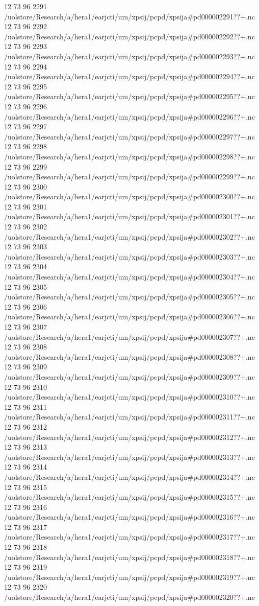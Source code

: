 12 73 96
2291
/uolstore/Research/a/hera1/earjcti/um/xpsij/pcpd/xpsija#pd000002291??+.nc
12 73 96
2292
/uolstore/Research/a/hera1/earjcti/um/xpsij/pcpd/xpsija#pd000002292??+.nc
12 73 96
2293
/uolstore/Research/a/hera1/earjcti/um/xpsij/pcpd/xpsija#pd000002293??+.nc
12 73 96
2294
/uolstore/Research/a/hera1/earjcti/um/xpsij/pcpd/xpsija#pd000002294??+.nc
12 73 96
2295
/uolstore/Research/a/hera1/earjcti/um/xpsij/pcpd/xpsija#pd000002295??+.nc
12 73 96
2296
/uolstore/Research/a/hera1/earjcti/um/xpsij/pcpd/xpsija#pd000002296??+.nc
12 73 96
2297
/uolstore/Research/a/hera1/earjcti/um/xpsij/pcpd/xpsija#pd000002297??+.nc
12 73 96
2298
/uolstore/Research/a/hera1/earjcti/um/xpsij/pcpd/xpsija#pd000002298??+.nc
12 73 96
2299
/uolstore/Research/a/hera1/earjcti/um/xpsij/pcpd/xpsija#pd000002299??+.nc
12 73 96
2300
/uolstore/Research/a/hera1/earjcti/um/xpsij/pcpd/xpsija#pd000002300??+.nc
12 73 96
2301
/uolstore/Research/a/hera1/earjcti/um/xpsij/pcpd/xpsija#pd000002301??+.nc
12 73 96
2302
/uolstore/Research/a/hera1/earjcti/um/xpsij/pcpd/xpsija#pd000002302??+.nc
12 73 96
2303
/uolstore/Research/a/hera1/earjcti/um/xpsij/pcpd/xpsija#pd000002303??+.nc
12 73 96
2304
/uolstore/Research/a/hera1/earjcti/um/xpsij/pcpd/xpsija#pd000002304??+.nc
12 73 96
2305
/uolstore/Research/a/hera1/earjcti/um/xpsij/pcpd/xpsija#pd000002305??+.nc
12 73 96
2306
/uolstore/Research/a/hera1/earjcti/um/xpsij/pcpd/xpsija#pd000002306??+.nc
12 73 96
2307
/uolstore/Research/a/hera1/earjcti/um/xpsij/pcpd/xpsija#pd000002307??+.nc
12 73 96
2308
/uolstore/Research/a/hera1/earjcti/um/xpsij/pcpd/xpsija#pd000002308??+.nc
12 73 96
2309
/uolstore/Research/a/hera1/earjcti/um/xpsij/pcpd/xpsija#pd000002309??+.nc
12 73 96
2310
/uolstore/Research/a/hera1/earjcti/um/xpsij/pcpd/xpsija#pd000002310??+.nc
12 73 96
2311
/uolstore/Research/a/hera1/earjcti/um/xpsij/pcpd/xpsija#pd000002311??+.nc
12 73 96
2312
/uolstore/Research/a/hera1/earjcti/um/xpsij/pcpd/xpsija#pd000002312??+.nc
12 73 96
2313
/uolstore/Research/a/hera1/earjcti/um/xpsij/pcpd/xpsija#pd000002313??+.nc
12 73 96
2314
/uolstore/Research/a/hera1/earjcti/um/xpsij/pcpd/xpsija#pd000002314??+.nc
12 73 96
2315
/uolstore/Research/a/hera1/earjcti/um/xpsij/pcpd/xpsija#pd000002315??+.nc
12 73 96
2316
/uolstore/Research/a/hera1/earjcti/um/xpsij/pcpd/xpsija#pd000002316??+.nc
12 73 96
2317
/uolstore/Research/a/hera1/earjcti/um/xpsij/pcpd/xpsija#pd000002317??+.nc
12 73 96
2318
/uolstore/Research/a/hera1/earjcti/um/xpsij/pcpd/xpsija#pd000002318??+.nc
12 73 96
2319
/uolstore/Research/a/hera1/earjcti/um/xpsij/pcpd/xpsija#pd000002319??+.nc
12 73 96
2320
/uolstore/Research/a/hera1/earjcti/um/xpsij/pcpd/xpsija#pd000002320??+.nc
